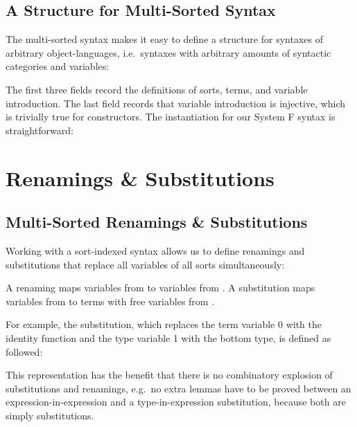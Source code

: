 \documentclass[sigplan,10pt, anonymous]{acmart}
\newenvironment{LibCode*}{%
  \begin{tcolorbox}[%
    colframe=white,%
    boxrule=0.0pt,%
    top=2.5pt,%
    left=2.5pt,%
    bottom=2.5pt,%
    right=2.5pt,%
    boxsep=0pt%
  ]\vspace{-0.2\baselineskip}%
}{%
  \vspace{-1\baselineskip}%
  \end{tcolorbox}%
}
\newenvironment{ExampleCode*}{%
  \begin{tcolorbox}[%
    colframe=white,%
    colback=yellow!5,%
    boxrule=0.0pt,%
    top=2.5pt,%
    left=2.5pt,%
    bottom=2.5pt,%
    right=2.5pt,%
    boxsep=0pt%
  ]\vspace{-0.2\baselineskip}%
}{%
  \vspace{-1\baselineskip}%
  \end{tcolorbox}%
}
\newcommand*\LibCode[1]{\begin{LibCode*}{#1}\end{LibCode*}}
\newcommand*\AppCode[1]{{#1}}
\newcommand*\ExampleCode[1]{\begin{ExampleCode*}{#1}\end{ExampleCode*}}
\newcommand*\ACode[1]{\AgdaFontStyle{\textcolor{mygray}{#1}}}
\newcommand*\AField[1]{\AgdaField{#1}}
\newcommand*\ACon[1]{\AgdaInductiveConstructor{#1}}
\newcommand*\ADef[1]{\AgdaFunction{#1}}
\begin{document}

  \subsection{A Structure for Multi-Sorted Syntax}
  \label{sec:syntax:structure}
  The multi-sorted syntax makes it easy to define a structure for
  syntaxes of arbitrary object-languages, i.e.\ syntaxes with
  arbitrary amounts of syntactic categories and variables:
  \LibCode\KSyntax
  The first three fields record the definitions of sorts, terms, and variable introduction.
  The last field records that variable introduction
  \ACode{\AField{`\_}} is injective, which is trivially true for
  constructors. The instantiation for our System F syntax is
  straightforward:
  \AppCode\FSyntaxInst

  \section{Renamings \& Substitutions}
  \label{sec:maps}
  \subsection{Multi-Sorted Renamings \& Substitutions}
  \label{sec:maps:example}
  Working with a sort-indexed syntax allows us to define renamings and substitutions
  that replace all variables of all sorts simultaneously:

  \ExampleCode\FExampleSubRen

  A renaming \ACode{S₁ \ADef{→ᵣ} S₂} maps variables from \ACode{S₁} to
  variables from \ACode{S₂}.
  A substitution \ACode{S₁ \ADef{→ₛ} S₂} maps variables from \ACode{S₁} to
  terms with free variables from \ACode{S₂}.

  For example, the substitution, which replaces the term variable 0 with the
  identity function and the type variable 1 with the bottom type, is defined
  as followed:
  \ExampleCode\FExampleSub

  This representation has the benefit that there is no combinatory
  explosion of substitutions and renamings, e.g.\ no extra lemmas have to be
  proved between an expression-in-expression and a type-in-expression
  substitution, because both are simply substitutions.
\end{document}
